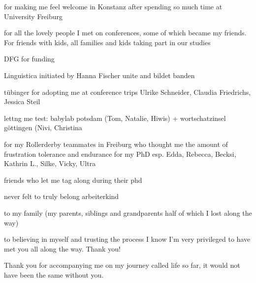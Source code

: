 for making me feel welcome in Konstanz after spending so much time at University Freiburg

for all the lovely people I met on conferences, some of which became my friends.
For friends with kids, all families and kids taking part in our studies

DFG for funding

Linguistica initiated by Hanna Fischer
unite and bildet banden

tübinger for adopting me at conference trips Ulrike Schneider, Claudia Friedrichs, Jessica Steil

lettng me test: babylab potsdam (Tom, Natalie, Hiwis) + wortschatzinsel göttingen (Nivi, Christina


for my Rollerderby teammates in Freiburg who thought me the amount of frustration tolerance and endurance for my PhD
esp. Edda, Rebecca, Becksi, Kathrin L., Silke, Vicky, Ultra

friends who let me tag along during their phd

never felt to truly belong
arbeiterkind

to my family (my parents, siblings and grandparents half of which I lost along the way)

to believing in myself and trusting the process
I know I'm very privileged to have met you all along the way.
Thank you!


Thank you for accompanying me on my journey called life so far, it would not have been the same without you.
